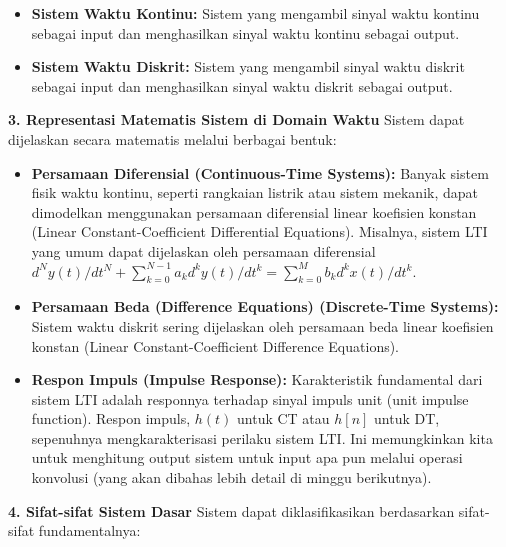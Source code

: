 \documentclass[
  letterpaper,
  DIV=11,
  numbers=noendperiod]{scrreprt}
\providecommand{\tightlist}{%
  \setlength{\itemsep}{0pt}\setlength{\parskip}{0pt}}
\begin{document}
\begin{itemize}
\tightlist
\item
  \textbf{Sistem Waktu Kontinu:} Sistem yang mengambil sinyal waktu
  kontinu sebagai input dan menghasilkan sinyal waktu kontinu sebagai
  output.
\item
  \textbf{Sistem Waktu Diskrit:} Sistem yang mengambil sinyal waktu
  diskrit sebagai input dan menghasilkan sinyal waktu diskrit sebagai
  output.
\end{itemize}

\textbf{3. Representasi Matematis Sistem di Domain Waktu} Sistem dapat
dijelaskan secara matematis melalui berbagai bentuk:

\begin{itemize}
\tightlist
\item
  \textbf{Persamaan Diferensial (Continuous-Time Systems):} Banyak
  sistem fisik waktu kontinu, seperti rangkaian listrik atau sistem
  mekanik, dapat dimodelkan menggunakan persamaan diferensial linear
  koefisien konstan (Linear Constant-Coefficient Differential
  Equations). Misalnya, sistem LTI yang umum dapat dijelaskan oleh
  persamaan diferensial
  \(d^Ny(t)/dt^N + \sum_{k=0}^{N-1} a_k d^ky(t)/dt^k = \sum_{k=0}^{M} b_k d^kx(t)/dt^k\).
\item
  \textbf{Persamaan Beda (Difference Equations) (Discrete-Time
  Systems):} Sistem waktu diskrit sering dijelaskan oleh persamaan beda
  linear koefisien konstan (Linear Constant-Coefficient Difference
  Equations).
\item
  \textbf{Respon Impuls (Impulse Response):} Karakteristik fundamental
  dari sistem LTI adalah responnya terhadap sinyal impuls unit (unit
  impulse function). Respon impuls, \(h(t)\) untuk CT atau \(h[n]\)
  untuk DT, sepenuhnya mengkarakterisasi perilaku sistem LTI. Ini
  memungkinkan kita untuk menghitung output sistem untuk input apa pun
  melalui operasi konvolusi (yang akan dibahas lebih detail di minggu
  berikutnya).
\end{itemize}

\textbf{4. Sifat-sifat Sistem Dasar} Sistem dapat diklasifikasikan
berdasarkan sifat-sifat fundamentalnya:
\end{document}
